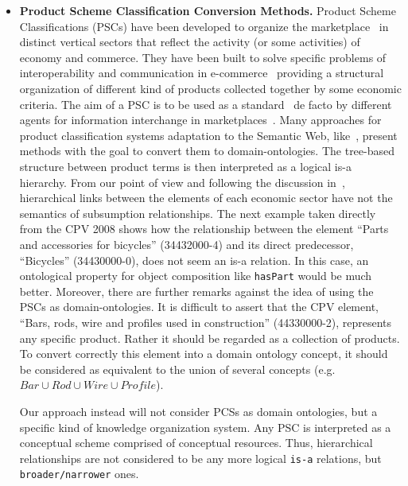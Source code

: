 \begin{itemize}
 \item \textbf{Product Scheme Classification Conversion Methods.}  Product Scheme Classifications (PSCs) have been developed to 
 organize the marketplace~\cite{Leukel-automating,Leukel-comparative} in distinct vertical sectors that reflect the 
 activity (or some activities) of economy and commerce. They have been built to solve specific problems of 
 interoperability and communication in e-commerce~\cite{Leukel-findings} providing a structural organization 
 of different kind of products collected together by some economic criteria. The aim of a PSC is to be used 
 as a standard~\cite{Leukel-standard} de facto by different agents for information interchange 
 in marketplaces~\cite{FenselOmel2001,FenselDing2001}. Many approaches for product classification systems adaptation to the Semantic Web, 
 like~\cite{Lonsdale:2010:ROL:1743778.1744005}, present methods with the goal to convert them to domain-ontologies. 
 The tree-based structure between product terms is then interpreted as a logical is-a hierarchy. 
 From our point of view and following the discussion in~\cite{Hepp:2007:POR:1256315.1256337,Hepp:2006:SWS:1128590.1128683}, hierarchical 
 links between the elements of each economic sector have not the semantics of subsumption relationships. The next example 
 taken directly from the CPV 2008 shows how the relationship between the element ``Parts and accessories for bicycles'' (34432000-4) 
 and its direct predecessor, ``Bicycles'' (34430000-0), does not seem an is-a relation. In this case, an ontological 
 property for object composition like \texttt{hasPart} would be much better. Moreover, there are further 
 remarks against the idea of using the PSCs as domain-ontologies. It is difficult to assert 
 that the CPV element, ``Bars, rods, wire and profiles used in construction'' (44330000-2), represents 
 any specific product. Rather it should be regarded as a collection of products. 
 To convert correctly this element into a domain ontology concept, it should be considered 
 as equivalent to the union of several concepts (e.g. $Bar \cup Rod \cup Wire \cup Profile$).
 
 Our approach instead will not consider PCSs as domain ontologies, but a specific kind of knowledge organization system. Any PSC is 
 interpreted as a conceptual scheme comprised of conceptual resources. Thus, hierarchical relationships are not 
 considered to be any more logical \texttt{is-a} relations, but \texttt{broader/narrower} ones. 

\end{itemize}
